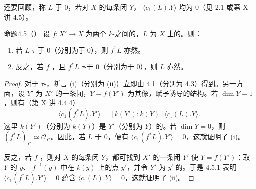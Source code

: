 还要回顾，称 $L$ 于 $0$，若对 $X$ 的每条闭 $Y$， $\langle c_1(L).Y\rangle$ 均为 $0$（见 2.1 或第 X 讲 4.5）。
\begin{SGAresult}{命题}{4.5（）}
设 $f:X'\to X$ 为两个 $k$-之间的，$L$ 为 $X$ 上的。则：
\begin{enumerate}
\item[(i)] 若 $L$ $\tau$-于 $0$（分别为于 $0$），则 $f^*L$ 亦然。
\item[(ii)] 反之，若 $f$ ，且 $f^*L$ $\tau$-于 $0$（分别为于 $0$），则 $L$ 亦然。
\end{enumerate}
\end{SGAresult}
\begin{proof}
对于 $\tau$-，断言 (i)（分别为 (ii)）立即由 4.1（分别为 4.3）得到。另一方面，设 $Y'$ 为 $X'$ 的一条闭，$Y=f(Y')$ 为其像，赋予诱导的结构。若 $\dim Y=1$，则有（第 X 讲 4.4.4）
\[\langle c_1(f^*L).Y'\rangle=[k(Y'):k(Y)]\langle c_1(L).Y\rangle.\tag{4.5.1}\]
这里 $k(Y')$（分别为 $k(Y)$）是 $Y'$（分别为 $Y$）的。若 $\dim Y=0$，则 $(f^*L)_{Y'}\simeq\mathscr O_{Y'}$。因此，若 $L$ 于 $0$，便有 $\langle c_1(f^*L).Y'\rangle=0$，这就证明了 (i)。

反之，若 $f$ ，则对 $X$ 的每条闭 $Y$，都可找到 $X'$ 的一条闭 $Y'$ 使 $Y=f(Y')$：取 $Y$ 的 $y$、 $f^{-1}(y)$ 中在 $k(y)$ 上的点 $y'$，并令 $Y'$ 为 $y'$ 的。于是 4.5.1 表明 $\langle c_1(f^*L).Y'\rangle=0$ 蕴含 $\langle c_1(L).Y\rangle=0$，这就证明了 (ii)。
\end{proof}

